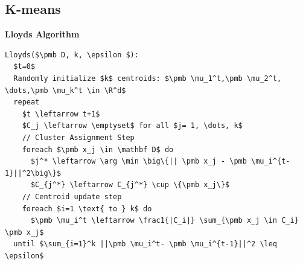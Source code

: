 \documentclass[a4, english]{article}
\begin{document}
\newpage
\subsection{K-means}
\begin{framed}
\begin{center}  
  \textbf{Lloyds Algorithm}
\end{center}
\begin{lstlisting}[mathescape=true, keywordstyle=\ttfamily]
Lloyds($\pmb D, k, \epsilon $):
  $t=0$  
  Randomly initialize $k$ centroids: $\pmb \mu_1^t,\pmb \mu_2^t, \dots,\pmb \mu_k^t \in \R^d$
  repeat 
    $t \leftarrow t+1$ 
    $C_j \leftarrow \emptyset$ for all $j= 1, \dots, k$ 
    // Cluster Assignment Step
    foreach $\pmb x_j \in \mathbf D$ do
      $j^* \leftarrow \arg \min \big\{|| \pmb x_j - \pmb \mu_i^{t-1}||^2\big\}$ 
      $C_{j^*} \leftarrow C_{j^*} \cup \{\pmb x_j\}$
    // Centroid update step
    foreach $i=1 \text{ to } k$ do
      $\pmb \mu_i^t \leftarrow \frac1{|C_i|} \sum_{\pmb x_j \in C_i} \pmb x_j$
  until $\sum_{i=1}^k ||\pmb \mu_i^t- \pmb \mu_i^{t-1}||^2 \leq \epsilon$
\end{lstlisting}
\end{framed}
\end{document}
